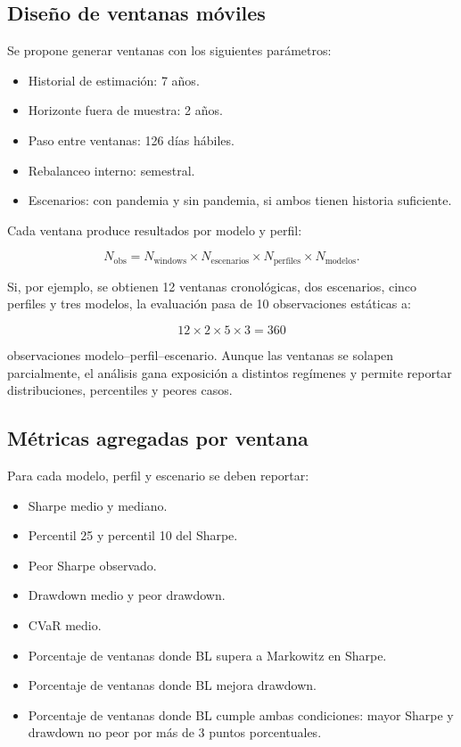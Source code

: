 \documentclass[11pt]{article}
\begin{document}
\subsection{Dise\~no de ventanas m\'oviles}

Se propone generar ventanas con los siguientes par\'ametros:

\begin{itemize}
    \item Historial de estimaci\'on: 7 a\~nos.
    \item Horizonte fuera de muestra: 2 a\~nos.
    \item Paso entre ventanas: 126 d\'ias h\'abiles.
    \item Rebalanceo interno: semestral.
    \item Escenarios: con pandemia y sin pandemia, si ambos tienen historia suficiente.
\end{itemize}

Cada ventana produce resultados por modelo y perfil:

\[
N_{\text{obs}} = N_{\text{windows}} \times N_{\text{escenarios}} \times N_{\text{perfiles}} \times N_{\text{modelos}}.
\]

Si, por ejemplo, se obtienen 12 ventanas cronol\'ogicas, dos escenarios, cinco perfiles y tres modelos, la evaluaci\'on pasa de 10 observaciones est\'aticas a:

\[
12 \times 2 \times 5 \times 3 = 360
\]

observaciones modelo--perfil--escenario. Aunque las ventanas se solapen parcialmente, el an\'alisis gana exposici\'on a distintos reg\'imenes y permite reportar distribuciones, percentiles y peores casos.

\subsection{M\'etricas agregadas por ventana}

Para cada modelo, perfil y escenario se deben reportar:

\begin{itemize}
    \item Sharpe medio y mediano.
    \item Percentil 25 y percentil 10 del Sharpe.
    \item Peor Sharpe observado.
    \item Drawdown medio y peor drawdown.
    \item CVaR medio.
    \item Porcentaje de ventanas donde BL supera a Markowitz en Sharpe.
    \item Porcentaje de ventanas donde BL mejora drawdown.
    \item Porcentaje de ventanas donde BL cumple ambas condiciones: mayor Sharpe y drawdown no peor por m\'as de 3 puntos porcentuales.
\end{itemize}
\end{document}
